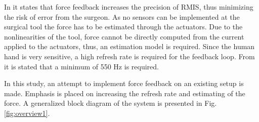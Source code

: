 






In \cite{} it states that force feedback increases the precision of RMIS, thus minimizing the risk of error from the surgeon.  As no sensors can be implemented at the surgical tool the force has to be estimated through the actuators. Due to the nonlinearities of the tool, force cannot be directly computed from the current applied to the actuators, thus, an estimation model is required. 
Since the human hand is very sensitive, a high refresh rate is required for the feedback loop.
From \cite{} it is stated that a minimum of 550 Hz is required. 

In this study, an attempt to implement force feedback on an existing setup is made. Emphasis is placed on increasing the refresh rate and estimating of the force. A generalized block diagram of the system is presented in Fig. \ref{fig:overview1}.

%

